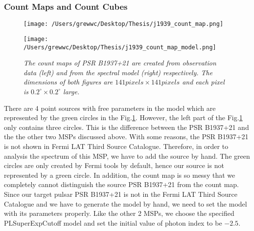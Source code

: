 \documentclass[12pt]{report}
\newcommand{\mycaption}[1]{\caption{\textit{\footnotesize #1}}}
\begin{document}
          \subsubsection{Count Maps and Count Cubes}
          \begin{figure}[!ht]
            \begin{center}
            \begin{minipage}{0.45\textwidth}
              \begin{center} 
                \texttt{[image: /Users/grewwc/Desktop/Thesis/j1939\_count\_map.png]}
              \end{center}
            \end{minipage}
            \begin{minipage}{0.45\textwidth}
              \begin{center}
                \texttt{[image: /Users/grewwc/Desktop/Thesis/j1939\_count\_map\_model.png]}
              \end{center}
            \end{minipage}
          \end{center}
          \mycaption{The count maps of PSR B1937+21 are created from observation 
            data (\textsf{left}) and from the spectral model (\textsf{right}) respectively. 
            The dimensions of both figures are $141 pixels \times 141 pixels$ and each pixel is 
            $0.2^{\circ}\times0.2^{\circ}$ large.}
            \label{fig: j1939_count_map}
          \end{figure}
          \vspace{1cm}

          There are 4 point sources with free parameters in the model which are represented by the green 
          circles in the Fig.\ref{fig: j1939_count_map}.
          However, the left part of the Fig.\ref{fig: j1939_count_map} only contains three circles.
          This is the difference between the PSR B1937+21 and the the other two MSPs discussed 
          above. With some reasons, the PSR B1937+21 is not shown in Fermi LAT Third Source Catalogue.
          Therefore, in order to analysis the spectrum of this MSP, we have to add the source 
          by hand. The green circles are only created by Fermi tools by default, hence our source is 
          not represented by a green circle. In addition, the count map is so messy that we completely 
          cannot distinguish the source PSR B1937+21 from the count map. 
          Since our target pulsar PSR B1937+21 is not in the Fermi LAT Third Source Catalogue and 
          we have to generate the model by hand, we need to set the model with its parameters properly.
          Like the other 2 MSPs, we choose the specified PLSuperExpCutoff model and set the initial value 
          of photon index to be $-2.5$.
\end{document}
